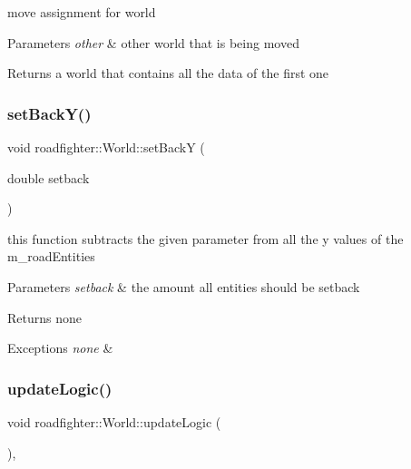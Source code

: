 move assignment for world 
\begin{DoxyParams}{Parameters}
{\em other} & other world that is being moved \\
\hline
\end{DoxyParams}
\begin{DoxyReturn}{Returns}
a world that contains all the data of the first one 
\end{DoxyReturn}
\mbox{\label{classroadfighter_1_1World_abaf87df4c66473070ccf57bacbe56419}} 
\subsubsection{\texorpdfstring{set\+Back\+Y()}{setBackY()}}
{\footnotesize\ttfamily void roadfighter\+::\+World\+::set\+BackY (\begin{DoxyParamCaption}\item[{double}]{setback }\end{DoxyParamCaption})}

this function subtracts the given parameter from all the y values of the m\+\_\+road\+Entities 
\begin{DoxyParams}{Parameters}
{\em setback} & the amount all entities should be setback \\
\hline
\end{DoxyParams}
\begin{DoxyReturn}{Returns}
none 
\end{DoxyReturn}

\begin{DoxyExceptions}{Exceptions}
{\em none} & \\
\hline
\end{DoxyExceptions}
\mbox{\label{classroadfighter_1_1World_a066592a75c8a38e241013707b429206c}} 
\subsubsection{\texorpdfstring{update\+Logic()}{updateLogic()}}
{\footnotesize\ttfamily void roadfighter\+::\+World\+::update\+Logic (\begin{DoxyParamCaption}{ }\end{DoxyParamCaption})\hspace{0.3cm}{\ttfamily [override]}, {\ttfamily [virtual]}}


